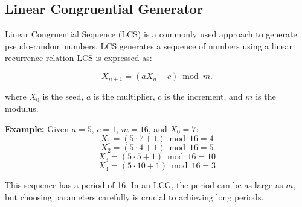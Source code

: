 	\subsection{Linear Congruential Generator}
	
	Linear Congruential Sequence (LCS) is a commonly used approach to generate
	pseudo-random numbers. LCS generates a sequence of numbers using a linear
	recurrence relation LCS is expressed as:

		$$X_{n+1} = (aX_n + c) \bmod m.$$

	where $X_0$ is the seed, $a$ is the multiplier, $c$ is the increment, and $m$ is the modulus.
	
	\textbf{Example:} Given $a = 5$, $c = 1$, $m = 16$, and $X_0 = 7$:
		$$X_1 = (5 \cdot 7 + 1)\bmod 16 = 4 $$
		$$X_2 = (5 \cdot 4 + 1) \bmod 16 = 5 $$
		$$X_3 = (5 \cdot 5 + 1) \bmod 16 = 10 $$
		$$X_4 = (5 \cdot 10 + 1) \bmod 16 = 3 $$

	
	This sequence has a period of 16. In an LCG, the period can be as large as $m$, but choosing parameters carefully is crucial to achieving long periods.
